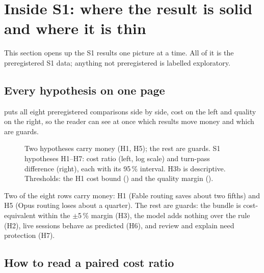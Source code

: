 \section{Inside S1: where the result is solid and where it is thin}\label{sec:s1detail}

This section opens up the S1 results one picture at a time. All of it is the preregistered S1 data; anything not
preregistered is labelled exploratory.

\subsection{Every hypothesis on one page}

 puts all eight preregistered comparisons side by side, cost on the left and quality on the right, so the reader can see at once which results move money and which are guards.

\begin{figure}[htbp]
\centering
{}\par\smallskip

\caption{Two hypotheses carry money (H1, H5); the rest are guards. S1 hypotheses H1--H7: cost ratio (left, log scale) and turn-pass difference (right), each with its 95\,\%
interval. H3b is descriptive. Thresholds: the H1 cost bound (\SThreshOne) and the quality margin (\NIMargin).}
\label{fig:s1forest}
\end{figure}

\begin{keyidea}
Two of the eight rows carry money: H1 (Fable routing saves about two fifths) and H5 (Opus routing loses about a
quarter). The rest are guards: the bundle is cost-equivalent within the \(\pm\)5\,\% margin (H3), the model adds nothing over the rule (H2), live sessions behave as
predicted (H6), and review and explain need protection (H7).
\end{keyidea}

\subsection{How to read a paired cost ratio}\label{sec:worked}

